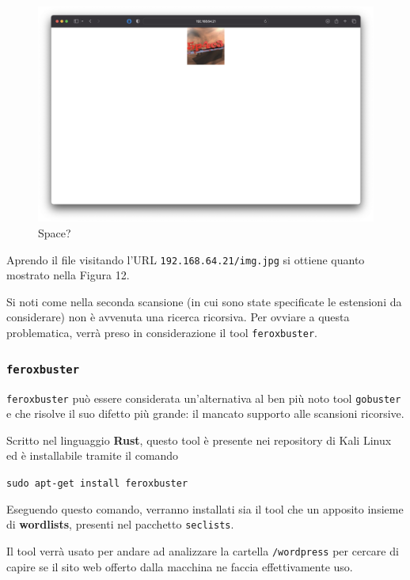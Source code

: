 \documentclass[a4paper, 12pt, oneside]{article}
\begin{document}
\begin{figure}[h!]
    \centering
    \includegraphics[width=\textwidth]{img/space.png}
    \caption{Space?}
\end{figure}

Aprendo il file visitando l'URL \texttt{192.168.64.21/img.jpg} si ottiene quanto mostrato nella Figura 12.

Si noti come nella seconda scansione (in cui sono state specificate le estensioni da considerare) non è avvenuta una ricerca ricorsiva. Per ovviare a questa problematica, verrà preso in considerazione il tool \texttt{feroxbuster}.

\subsubsection{\texttt{feroxbuster}}

\texttt{feroxbuster} può essere considerata un'alternativa al ben più noto tool \texttt{gobuster} e che risolve il suo difetto più grande: il mancato supporto alle scansioni ricorsive. \cite{feroxbuster}

Scritto nel linguaggio \textbf{Rust}, questo tool è presente nei repository di Kali Linux ed è installabile tramite il comando

\begin{center}
    \texttt{sudo apt-get install feroxbuster}
\end{center}

Eseguendo questo comando, verranno installati sia il tool che un apposito insieme di \textbf{wordlists}, presenti nel pacchetto \texttt{seclists}.

Il tool verrà usato per andare ad analizzare la cartella \texttt{/wordpress} per cercare di capire se il sito web offerto dalla macchina ne faccia effettivamente uso.
\end{document}
